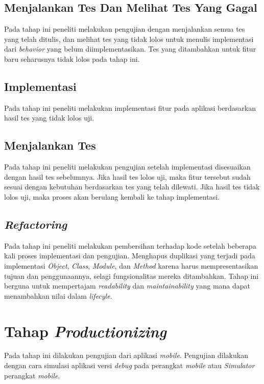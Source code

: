 \begin{spacing}{2}
    \subsection{Menjalankan Tes Dan Melihat Tes Yang Gagal}
      Pada tahap ini peneliti melakukan pengujian dengan menjalankan semua tes yang telah ditulis, dan melihat tes yang tidak lolos untuk menulis implementasi dari \emph{behavior} yang belum diimplementasikan. Tes yang ditambahkan untuk fitur baru seharusnya tidak lolos pada tahap ini.

    \subsection{Implementasi}
      Pada tahap ini peneliti melakukan implementasi fitur pada aplikasi berdasarkan hasil tes yang tidak lolos uji.

    \subsection{Menjalankan Tes}
      Pada tahap ini peneliti melakukan pengujian setelah implementasi disesuaikan dengan hasil tes sebelumnya. Jika hasil tes lolos uji, maka fitur tersebut sudah sesuai dengan kebutuhan berdasarkan tes yang telah dilewati. Jika hasil tes tidak lolos uji, maka proses akan berulang kembali ke tahap implementasi.

    \subsection{\emph{Refactoring}}
      Pada tahap ini peneliti melakukan pembersihan terhadap kode setelah beberapa kali proses implementasi dan pengujian. Menghapus duplikasi yang terjadi pada implementasi \emph{Object}, \emph{Class}, \emph{Module}, dan \emph{Method} karena harus mempresentasikan tujuan dan penggunaannya, selagi fungsionalitas mereka ditambahkan. Tahap ini berguna untuk mempertajam \emph{readability} dan \emph{maintainability} yang mana dapat menambahkan nilai dalam \emph{lifecyle}.

  \section{Tahap \emph{Productionizing}}
    Pada tahap ini dilakukan pengujian dari aplikasi \emph{mobile}. Pengujian dilakukan dengan cara simulasi aplikasi versi \emph{debug} pada perangkat \emph{mobile} atau \emph{Simulator} perangkat \emph{mobile}.


\end{spacing}
